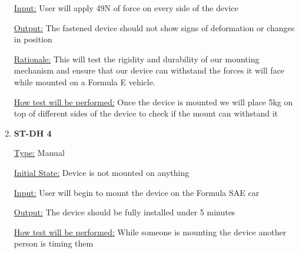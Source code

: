 \documentclass[12pt, titlepage]{article}
\begin{document}
\begin{enumerate}
    \underline{Input:} User will apply 49N of force on every side of the device
              
    \underline{Output:} The fastened device should not show signs of deformation or changes in position

    \underline{Rationale:} This will test the rigidity and durability of our mounting mechanism and ensure that our device can withstand the forces it will face while mounted on a Formula E vehicle.
    
              
    \underline{How test will be performed:} Once the device is mounted we will place 5kg on top of different sides of the device to check if the mount can withstand it \\

    \item{\bf{ST-DH 4}}
    
    \underline{Type:} Manual
              
    \underline{Initial State:} Device is not mounted on anything
              
    \underline{Input:} User will begin to mount the device on the Formula SAE car
              
    \underline{Output:} The device should be fully installed under 5 minutes
    
              
    \underline{How test will be performed:} While someone is mounting the device another person is timing them \\

    
              
              
              
    
              
  
    \end{enumerate}
\end{document}
